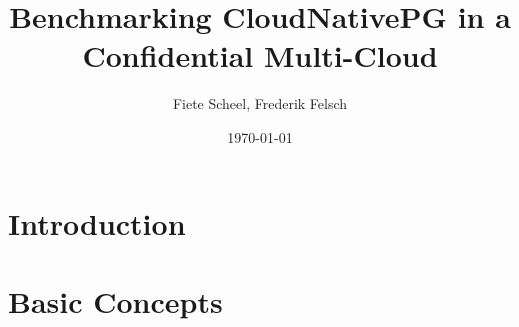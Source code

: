 \documentclass[a4paper, ngerman, 12pt]{scrreprt}
\begin{document}
\title{Benchmarking CloudNativePG in a Confidential Multi-Cloud} %
\author{Fiete Scheel, Frederik Felsch} %
\date{\today} %

\maketitle

\tableofcontents
\newpage

\chapter{Introduction}


\chapter{Basic Concepts}


\printbibliography


\end{document}
